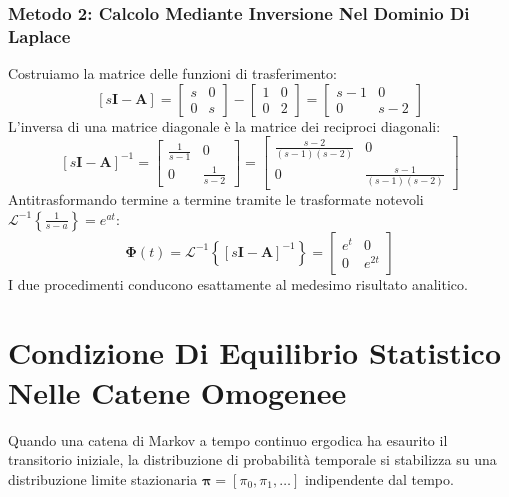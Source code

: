 \documentclass[11pt, a4paper]{article}
\begin{document}
\subsubsection{Metodo 2: Calcolo Mediante Inversione Nel Dominio Di Laplace}
Costruiamo la matrice delle funzioni di trasferimento:
\[
    [s\bm{I} - \bm{A}] = \begin{bmatrix} s & 0 \\ 0 & s \end{bmatrix} - \begin{bmatrix} 1 & 0 \\ 0 & 2 \end{bmatrix} = \begin{bmatrix} s-1 & 0 \\ 0 & s-2 \end{bmatrix}
\]
L'inversa di una matrice diagonale è la matrice dei reciproci diagonali:
\[
    [s\bm{I} - \bm{A}]^{-1} = \begin{bmatrix} \frac{1}{s-1} & 0 \\ 0 & \frac{1}{s-2} \end{bmatrix} = \begin{bmatrix} \frac{s-2}{(s-1)(s-2)} & 0 \\ 0 & \frac{s-1}{(s-1)(s-2)} \end{bmatrix}
\]
Antitrasformando termine a termine tramite le trasformate notevoli $\mathcal{L}^{-1}\left\{\frac{1}{s-a}\right\} = e^{at}$:
\[
    \bm{\Phi}(t) = \mathcal{L}^{-1}\left\{ [s\bm{I} - \bm{A}]^{-1} \right\} = \begin{bmatrix} e^t & 0 \\ 0 & e^{2t} \end{bmatrix}
\]
I due procedimenti conducono esattamente al medesimo risultato analitico.

\newpage


\section{Condizione Di Equilibrio Statistico Nelle Catene Omogenee}

Quando una catena di Markov a tempo continuo ergodica ha esaurito il transitorio iniziale, la distribuzione di probabilità temporale si stabilizza su una distribuzione limite stazionaria $\bm{\pi} = [\pi_0, \pi_1, \dots]$ indipendente dal tempo.
\end{document}
